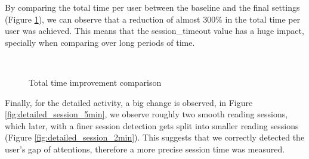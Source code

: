 By comparing the total time per user between the baseline and the final settings (Figure \ref{fig:total_time_comparison}), we can observe that a reduction of almost 300\% in the total time per user was achieved. This means that the session\_timeout value has a huge impact, specially when comparing over long periods of time.

\begin{figure}[!htb]
	\myfloatalign
	 \quad 
	 \\
	\caption{Total time improvement comparison}\label{fig:total_time_comparison}
\end{figure}

Finally, for the detailed activity, a big change is observed, in Figure \ref{fig:detailed_session_5min}, we observe roughly two smooth reading sessions, which later, with a finer session detection gets split into smaller reading sessions (Figure \ref{fig:detailed_session_2min}). This suggests that we correctly detected the user's gap of attentions, therefore a more precise session time was measured.

